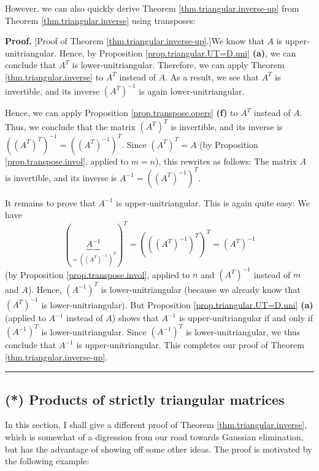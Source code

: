 \documentclass[numbers=enddot,12pt,final,onecolumn,notitlepage]{scrartcl}%
\theoremstyle{definition}
\newenvironment{proof}[1][Proof]{\noindent\textbf{#1.} }{\ \rule{0.5em}{0.5em}}
\begin{document}
However, we can also quickly derive Theorem \ref{thm.triangular.inverse-up}
from Theorem \ref{thm.triangular.inverse} using transposes:

\begin{proof}
[Proof of Theorem \ref{thm.triangular.inverse-up}.]We know that $A$ is
upper-unitriangular. Hence, by Proposition \ref{prop.triangular.UT=D.uni}
\textbf{(a)}, we can conclude that $A^{T}$ is lower-unitriangular. Therefore,
we can apply Theorem \ref{thm.triangular.inverse} to $A^{T}$ instead of $A$.
As a result, we see that $A^{T}$ is invertible, and its inverse $\left(
A^{T}\right)  ^{-1}$ is again lower-unitriangular.

Hence, we can apply Proposition \ref{prop.transpose.opers} \textbf{(f)} to
$A^{T}$ instead of $A$. Thus, we conclude that the matrix $\left(
A^{T}\right)  ^{T}$ is invertible, and its inverse is $\left(  \left(
A^{T}\right)  ^{T}\right)  ^{-1}=\left(  \left(  A^{T}\right)  ^{-1}\right)
^{T}$. Since $\left(  A^{T}\right)  ^{T}=A$ (by Proposition
\ref{prop.transpose.invol}, applied to $m=n$), this rewrites as follows: The
matrix $A$ is invertible, and its inverse is $A^{-1}=\left(  \left(
A^{T}\right)  ^{-1}\right)  ^{T}$.

It remains to prove that $A^{-1}$ is upper-unitriangular. This is again quite
easy: We have%
\[
\left(  \underbrace{A^{-1}}_{=\left(  \left(  A^{T}\right)  ^{-1}\right)
^{T}}\right)  ^{T}=\left(  \left(  \left(  A^{T}\right)  ^{-1}\right)
^{T}\right)  ^{T}=\left(  A^{T}\right)  ^{-1}%
\]
(by Proposition \ref{prop.transpose.invol}, applied to $n$ and $\left(
A^{T}\right)  ^{-1}$ instead of $m$ and $A$). Hence, $\left(  A^{-1}\right)
^{T}$ is lower-unitriangular (because we already know that $\left(
A^{T}\right)  ^{-1}$ is lower-unitriangular). But Proposition
\ref{prop.triangular.UT=D.uni} \textbf{(a)} (applied to $A^{-1}$ instead of
$A$) shows that $A^{-1}$ is upper-unitriangular if and only if $\left(
A^{-1}\right)  ^{T}$ is lower-unitriangular. Since $\left(  A^{-1}\right)
^{T}$ is lower-unitriangular, we thus conclude that $A^{-1}$ is
upper-unitriangular. This completes our proof of Theorem
\ref{thm.triangular.inverse-up}.
\end{proof}

\subsection{(*) Products of strictly triangular matrices}

In this section, I shall give a different proof of Theorem
\ref{thm.triangular.inverse}, which is somewhat of a digression from our road
towards Gaussian elimination, but has the advantage of showing off some other
ideas. The proof is motivated by the following example:
\end{document}
